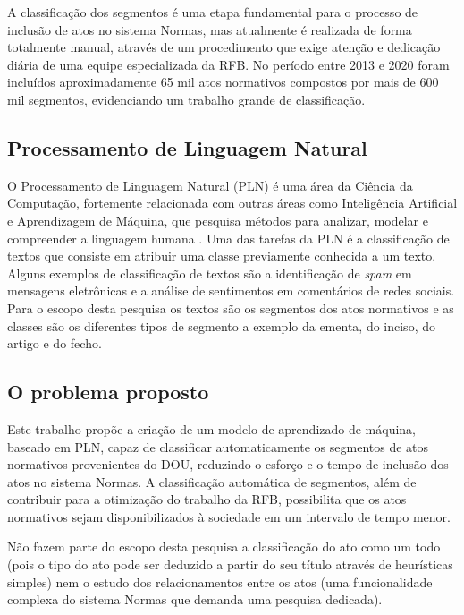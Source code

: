 A classificação dos segmentos é uma etapa fundamental para o processo de inclusão de atos no sistema Normas, mas atualmente é realizada de forma totalmente manual, através de um procedimento que exige atenção e dedicação diária de uma equipe especializada da RFB. No período entre 2013 e 2020 foram incluídos aproximadamente 65 mil atos normativos compostos por mais de 600 mil segmentos, evidenciando um trabalho grande de classificação.

\subsection{Processamento de Linguagem Natural}

O Processamento de Linguagem Natural (PLN) é uma área da Ciência da Computação, fortemente relacionada com outras áreas como Inteligência Artificial e Aprendizagem de Máquina, que pesquisa métodos para analizar, modelar e compreender a linguagem humana \cite{PracticalNLP2020}. Uma das tarefas da PLN é a classificação de textos que consiste em atribuir uma classe previamente conhecida a um texto. Alguns exemplos de classificação de textos são a identificação de \textit{spam} em mensagens eletrônicas e a análise de sentimentos em comentários de redes sociais. Para o escopo desta pesquisa os textos são os segmentos dos atos normativos e as classes são os diferentes tipos de segmento a exemplo da ementa, do inciso, do artigo e do fecho. 

\subsection{O problema proposto}

Este trabalho propõe a criação de um modelo de aprendizado de máquina, baseado em PLN, capaz de classificar automaticamente os segmentos de atos normativos provenientes do DOU, reduzindo o esforço e o tempo de inclusão dos atos no sistema Normas. A classificação automática de segmentos, além de contribuir para a otimização do trabalho da RFB, possibilita que os atos normativos sejam disponibilizados à sociedade em um intervalo de tempo menor.

Não fazem parte do escopo desta pesquisa a classificação do ato como um todo (pois o tipo do ato pode ser deduzido a partir do seu título através de heurísticas simples) nem o estudo dos relacionamentos entre os atos (uma funcionalidade complexa do sistema Normas que demanda uma pesquisa dedicada).

